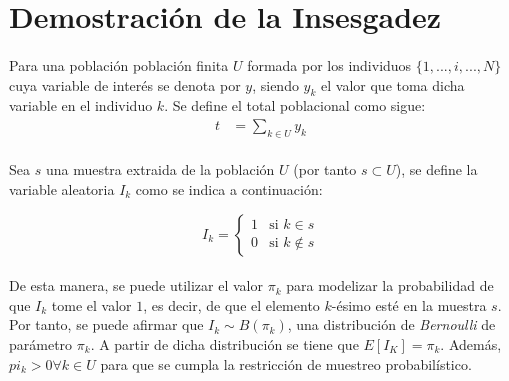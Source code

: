 \documentclass{article}
\begin{document}
	\maketitle
  \thispagestyle{empty}


  \section{Demostración de la Insesgadez}
  \label{sec:demostration_1}

    \paragraph{}
    Para una población población finita $U$ formada por los individuos $\{ 1, ..., i, ..., N\}$ cuya variable de interés se denota por $y$, siendo $y_k$ el valor que toma dicha variable en el individuo $k$. Se define el total poblacional como sigue:
    \begin{align}
      t &= \sum_{k \in U}y_k
    \end{align}

    \paragraph{}
    Sea $s$ una muestra extraida de la población $U$ (por tanto $s \subset U$), se define la variable aleatoria $I_k$ como se indica a continuación:

    \begin{equation}
      I_k =
      \begin{cases}
        1 & \text{si } k \in s \\
        0 & \text{si } k \not\in s
      \end{cases}
    \end{equation}

    \paragraph{}
    De esta manera, se puede utilizar el valor $\pi_k$ para modelizar la probabilidad de que $I_k$ tome el valor $1$, es decir, de que el elemento $k$-ésimo esté en la muestra $s$. Por tanto, se puede afirmar que $I_k \sim B(\pi_k)$, una distribución de \emph{Bernoulli} de parámetro $\pi_k$. A partir de dicha distribución se tiene que $E[I_K] = \pi_k$. Además, $pi_k > 0 \forall k \in U$ para que se cumpla la restricción de muestreo probabilístico.
\end{document}
